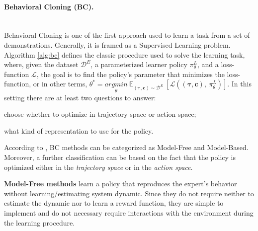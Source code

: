 \paragraph{Behavioral Cloning (BC).} \mbox{} \\ 
Behavioral Cloning is one of the first approach used to learn a task from a set of demonstrations. Generally, it is framed as a Supervised Learning problem. Algorithm \ref{alg:bc} defines the classic procedure used to solve the learning task, where, given the dataset $\mathcal{D}^{E}$, a parameterized learner policy $\pi^{L}_{\theta}$, and a loss-function $\mathcal{L}$, the goal is to find the policy's parameter that minimizes the loss-function, or in other terms, $\theta^{*} = \underset{\theta}{argmin} \ \mathbb{E}_{(\boldsymbol{\tau}, \mathbf{c}) \sim \mathcal{D}^{E}} \ [\mathcal{L}((\boldsymbol{\tau}, \mathbf{c}), \ \pi^{L}_{\theta})]$.
In this setting there are at least two questions to answer: 
\begin{enumerate*}[label=\textbf{(\arabic*)}]
    \item choose whether to optimize in trajectory space or action space;
    \item what kind of representation to use for the policy.
\end{enumerate*}
\newline According to \cite{osa2018algorithmic}, BC methods can be categorized as Model-Free and Model-Based. Moreover, a further classification can be based on the fact that the policy is optimized either in the \textit{trajectory space} or in the \textit{action space}. 
 

\textbf{Model-Free methods} learn a policy that reproduces the expert's behavior without learning/estimating system dynamic. Since they do not require neither to estimate the dynamic nor to learn a reward function, they are simple to implement and do not necessary require interactions with the environment during the learning procedure. 

